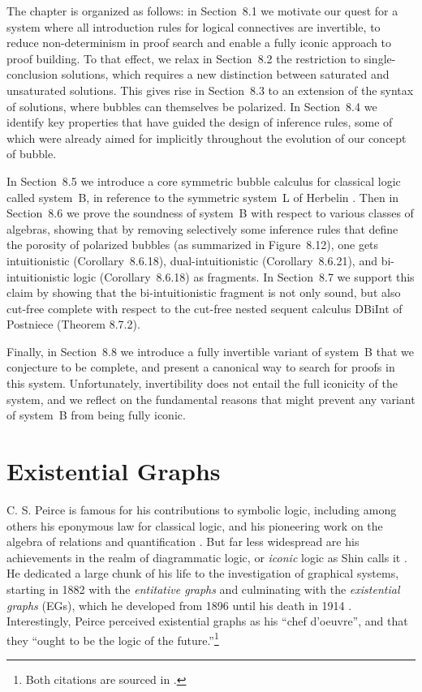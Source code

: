 \documentclass[11pt]{article}
\begin{document}
The chapter is organized as follows: in Section~8.1 we motivate our quest for a system where all introduction rules for logical connectives are invertible, to reduce non-determinism in proof search and enable a fully iconic approach to proof building. To that effect, we relax in Section~8.2 the restriction to single-conclusion solutions, which requires a new distinction between saturated and unsaturated solutions. This gives rise in Section~8.3 to an extension of the syntax of solutions, where bubbles can themselves be polarized. In Section~8.4 we identify key properties that have guided the design of inference rules, some of which were already aimed for implicitly throughout the evolution of our concept of bubble.

In Section~8.5 we introduce a core symmetric bubble calculus for classical logic called system~B, in reference to the symmetric system~L of Herbelin \cite{herbelin_duality_nodate}. Then in Section~8.6 we prove the soundness of system~B with respect to various classes of algebras, showing that by removing selectively some inference rules that define the porosity of polarized bubbles (as summarized in Figure~8.12), one gets intuitionistic (Corollary~8.6.18), dual-intuitionistic (Corollary~8.6.21), and bi-intuitionistic logic (Corollary~8.6.18) as fragments. In Section~8.7 we support this claim by showing that the bi-intuitionistic fragment is not only sound, but also cut-free complete with respect to the cut-free nested sequent calculus DBiInt of Postniece \cite{postniece_deep_2009} (Theorem 8.7.2).

Finally, in Section~8.8 we introduce a fully invertible variant of system~B that we conjecture to be complete, and present a canonical way to search for proofs in this system. Unfortunately, invertibility does not entail the full iconicity of the system, and we reflect on the fundamental reasons that might prevent any variant of system~B from being fully iconic.

\section{Existential Graphs}

C. S. Peirce is famous for his contributions to symbolic logic, including
among others his eponymous law for classical logic, and his pioneering work
on the algebra of relations and quantification \cite{peirce_algebra_1885}. But
far less widespread are his achievements in the realm of diagrammatic
logic, or \emph{iconic} logic as Shin calls it \cite{10.7551/mitpress/3633.001.0001}. He dedicated a large chunk of his life to
the investigation of graphical systems, starting in 1882 with the
\emph{entitative graphs} and culminating with the \emph{existential
graphs} (EGs), which he developed from 1896 until his death in 1914
\cite{Roberts+1973}. Interestingly, Peirce perceived existential graphs
as his ``chef d'oeuvre'', and that they ``ought to be the logic
of the future.''\footnote{Both citations are sourced in \cite[p.~11]{Roberts+1973}.}
\end{document}
